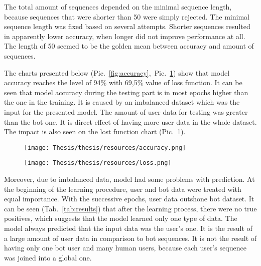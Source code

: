 The total amount of sequences depended on the minimal sequence length, because sequences that were shorter than 50 were simply rejected. The minimal sequence length was fixed based on several attempts. Shorter sequences resulted in apparently lower accuracy, when longer did not improve performance at all. The length of 50 seemed to be the golden mean between accuracy and amount of sequences.\par

The charts presented below \mbox{(Pic. \ref{fig:accuracy}, Pic. \ref{fig:loss})} show that model accuracy reaches the level of 94\% with 69,5\% value of loss function. It can be seen that model accuracy during the testing part is in most epochs higher than the one in the training. It is caused by an imbalanced dataset which was the input for the presented model. The amount of user data for testing was greater than the bot one. It is direct effect of having more user data in the whole dataset. The impact is also seen on the lost function chart \mbox{(Pic. \ref{fig:loss})}.\par

\begin{figure}[!hbt]
\centering
\begin{minipage}{.5\textwidth}
  \centering
  \texttt{[image: Thesis/thesis/resources/accuracy.png]}
  \captionsetup{width=\linewidth}
  \label{fig:accuracy}
\end{minipage}%
\begin{minipage}{.5\textwidth}
  \centering
  \texttt{[image: Thesis/thesis/resources/loss.png]}
  \captionsetup{width=\linewidth}
  \label{fig:loss}
\end{minipage}
\end{figure}

Moreover, due to imbalanced data, model had some problems with prediction. At the beginning of the learning procedure, user and bot data were treated with equal importance. With the successive epochs, user data outshone bot dataset. It can be seen \mbox{(Tab. \ref{tab:results})} that after the learning process, there were no true positives, which suggests that the model learned only one type of data. The model always predicted that the input data was the user's one. It is the result of a large amount of user data in comparison to bot sequences. It is not the result of having only one bot user and many human users, because each user's sequence was joined into a global one.\par
